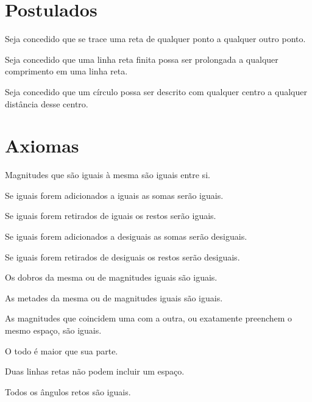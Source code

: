 \documentclass[booklanguage=brazilian]{byrnebook}
\begin{document}
\chapter*{Postulados}

\startpostulate{}\label{post:I.I}
Seja concedido que se trace uma reta de qualquer ponto a qualquer outro ponto.

\startpostulate{}\label{post:I.II}
Seja concedido que uma linha reta finita possa ser prolongada a qualquer comprimento em uma linha reta.

\startpostulate{}\label{post:I.III}
Seja concedido que um círculo possa ser descrito com qualquer centro a qualquer distância desse centro.

\chapter*{Axiomas}

\startaxiom{}\label{ax:I.I}
Magnitudes que são iguais à mesma são iguais entre si.

\startaxiom{}\label{ax:I.II}
Se iguais forem adicionados a iguais as somas serão iguais.

\startaxiom{}\label{ax:I.III}
Se iguais forem retirados de iguais os restos serão iguais.

\startaxiom{}\label{ax:I.IV}
Se iguais forem adicionados a desiguais as somas serão desiguais.

\startaxiom{}\label{ax:I.V}
Se iguais forem retirados de desiguais os restos serão desiguais.

\startaxiom{}\label{ax:I.VI}
Os dobros da mesma ou de magnitudes iguais são iguais.

\startaxiom{}\label{ax:I.VII}
As metades da mesma ou de magnitudes iguais são iguais.

\startaxiom{}\label{ax:I.VIII}
As magnitudes que coincidem uma com a outra, ou exatamente preenchem o mesmo espaço, são iguais.

\startaxiom{}\label{ax:I.IX}
O todo é maior que sua parte.

\startaxiom{}\label{ax:I.X}
Duas linhas retas não podem incluir um espaço.

\startaxiom{}\label{ax:I.XI}
Todos os ângulos retos são iguais.
\end{document}
